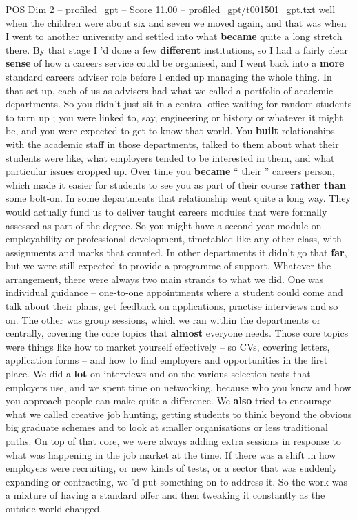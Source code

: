 \begin{textsample}{POS Dim 2 – profiled\_gpt – Score 11.00 – profiled\_gpt/t001501\_gpt.txt}  \label{ex:f2_pos_001}
well when the children were about six and seven we moved again, and that was when I went to another university and settled into what \textbf{became} quite a long stretch there.
By that stage I ’d done a few \textbf{different} institutions, so I had a fairly clear \textbf{sense} of how a careers service could be organised, and I went back into a \textbf{more} standard careers adviser role before I ended up managing the whole thing.
In that set‑up, each of us as advisers had what we called a portfolio of academic departments.
So you didn't just sit in a central office waiting for random students to turn up ; you were linked to, say, engineering or history or whatever it might be, and you were expected to get to know that world.
You \textbf{built} relationships with the academic staff in those departments, talked to them about what their students were like, what employers tended to be interested in them, and what particular issues cropped up.
Over time you \textbf{became} “ their ” careers person, which made it easier for students to see you as part of their course \textbf{rather} \textbf{than} some bolt‑on.
In some departments that relationship went quite a long way.
They would actually fund us to deliver taught careers modules that were formally assessed as part of the degree.
So you might have a second‑year module on employability or professional development, timetabled like any other class, with assignments and marks that counted.
In other departments it didn't go that \textbf{far}, but we were still expected to provide a programme of support.
Whatever the arrangement, there were always two main strands to what we did.
One was individual guidance – one‑to‑one appointments where a student could come and talk about their plans, get feedback on applications, practise interviews and so on.
The other was group sessions, which we ran within the departments or centrally, covering the core topics that \textbf{almost} everyone needs.
Those core topics were things like how to market yourself effectively – so CVs, covering letters, application forms – and how to find employers and opportunities in the first place.
We did a \textbf{lot} on interviews and on the various selection tests that employers use, and we spent time on networking, because who you know and how you approach people can make quite a difference.
We \textbf{also} tried to encourage what we called creative job hunting, getting students to think beyond the obvious big graduate schemes and to look at smaller organisations or less traditional paths.
On top of that core, we were always adding extra sessions in response to what was happening in the job market at the time.
If there was a shift in how employers were recruiting, or new kinds of tests, or a sector that was suddenly expanding or contracting, we ’d put something on to address it.
So the work was a mixture of having a standard offer and then tweaking it constantly as the outside world changed.

\end{textsample}
